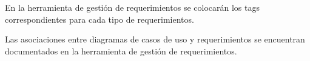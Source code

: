 En la herramienta de gestión de requerimientos se colocarán los tags
correspondientes para cada tipo de requerimientos.


Las asociaciones entre diagramas de casos de uso y requerimientos se encuentran
documentados en la herramienta de gestión de requerimientos. 


\newpage
